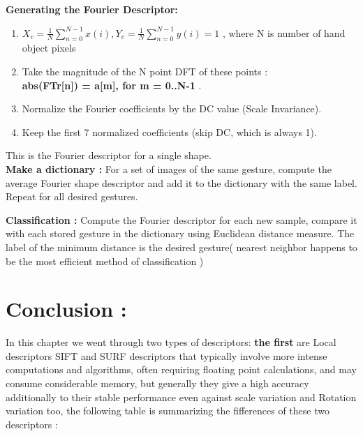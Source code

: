 \textbf{Generating the Fourier Descriptor: }
\begin{enumerate}
    \item $X_{c} = \frac{1}{N}\sum_{n=0}^{N-1} x(i) , Y_{c} = \frac{1}{N}\sum_{n=0}^{N-1} y(i)  = 1$ , where N is number of hand object pixels 
    \item Take the magnitude of the N point DFT of these points :\\
              \textbf{ abs(FT{r[n]}) = a[m], for m = 0..N-1 }.
    \item Normalize the Fourier coefficients by the DC value (Scale Invariance).
    \item Keep the first 7 normalized coefficients (skip DC, which is always 1).

\end{enumerate}


This is the Fourier descriptor for a single shape.\\

\textbf{Make a dictionary : } For a set of images of the same gesture, compute the average Fourier shape descriptor and add it to the dictionary with the same label.  Repeat for all desired gestures.

\textbf{Classification  : }Compute the Fourier descriptor for each new sample, compare it with each stored gesture in the dictionary using  Euclidean distance measure.  The label of the minimum distance is the desired gesture( nearest neighbor happens to be the most efficient method of classification )


 \section{ Conclusion : }
 In this chapter we went through two types of descriptors:
\textbf{the first} are  Local descriptors SIFT and SURF  descriptors that typically involve more intense computations and algorithms, often requiring floating point calculations, and may consume considerable memory, but generally they give a high  accuracy additionally to their stable performance even against scale variation and Rotation variation too, the following table is summarizing the fifferences of these two descriptors :

